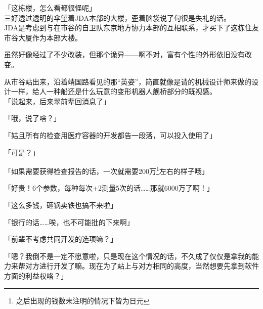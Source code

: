 「这栋楼，怎么看都很怪呢」\\

三好透过透明的伞望着JDA本部的大楼，歪着脑袋说了句很是失礼的话。\\

JDA是考虑到与在市谷的自卫队东京地方协力本部的互相联系，才买下了这栋住友市谷大厦作为本部大楼。

虽然好像经过了不少改装，但那个诡异——啊不对，富有个性的外形依旧没有改变。

从市谷站出来，沿着靖国路看见的那“英姿”，简直就像是请的机械设计师来做的设计一样，给人一种船还是什么玩意的变形机器人舰桥部分的既视感。\\

「说起来，后来翠前辈回消息了」

「哦，说了啥？」

「姑且所有的检查用医疗容器的开发都告一段落，可以投入使用了」

「可是？」

「如果需要获得检查报告的话，一次就需要200万\footnote{之后出现的钱数未注明的情况下皆为日元}左右的样子哦」

「好贵！6个参数，每种每次+2测量5次的话……那就6000万了啊！」

「这么多钱，砸锅卖铁也搞不来啦」

「银行的话……唉，也不可能批的下来啊」

「前辈不考虑共同开发的选项嘛？」

「嗯？我倒不是一定不愿意啦，只是现在这个情况的话，不久成了仅仅是拿我的能力来帮对方进行开发了嘛。现在为了站上与对方相同的高度，当然想要先拿到软件方面的利益权咯？」

